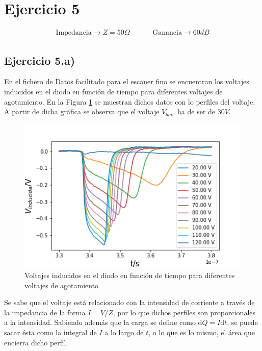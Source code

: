 \documentclass[twoside]{article}
\begin{document}
	\section{Ejercicio 5}

		\begin{equation}
			\begin{matrix}

				\textrm{Impedancia} \rightarrow Z = 50 \Omega & & & &  \textrm{Ganancia} \rightarrow 60 dB
			\end{matrix}
		\end{equation}

		\subsection{Ejercicio 5.a)}

			En el fichero de Datos facilitado para el escaner fino se encuentran los voltajes inducidos en el diodo en función de tiempo para diferentes voltajes de agotamiento. En la Figura \ref{Img:fina} se muestran dichos datos con lo perfiles del voltaje. A partir de dicha gráfica se observa que el voltaje $V_{bias}$ ha de ser de $30 V$.

				\begin{figure}[H]
					\centering
					\includegraphics[scale=0.8]{fina.png}
					\caption{\label{Img:fina}Voltajes inducidos en el diodo en función de tiempo para diferentes voltajes de agotamiento}
				\end{figure}

			Se sabe que el voltaje está relacionado con la intensidad de corriente a través de la impedancia de la forma $I = V/Z$, por lo que dichos perfiles son proporcionales a la intensidad. Sabiendo además que la carga se define como $\mathrm{d}Q = I \mathrm{d}t$, se puede sacar ésta como la integral de $I$ a lo largo de $t$, o lo que es lo mismo, el área que encierra dicho perfil.
\end{document}

